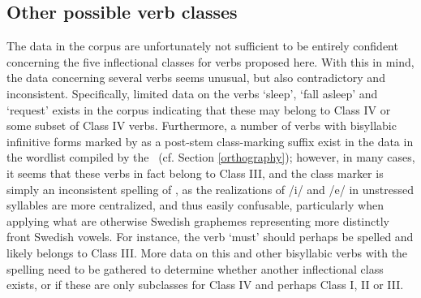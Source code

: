 \subsection{Other possible verb classes}\label{otherVerbClasses}
The data in the corpus are unfortunately not sufficient to be entirely confident concerning the five inflectional classes for verbs proposed here. With this in mind, the data concerning several verbs seems unusual, but also contradictory and inconsistent. Specifically, limited data on the verbs  ‘sleep’,  ‘fall asleep’  %
and  ‘request’ %
exists in the corpus indicating that these may belong to Class IV or some subset of Class IV verbs. Furthermore, a number of verbs with bisyllabic infinitive forms marked by  as a post-stem class-marking suffix exist in the data in the wordlist compiled by the \WLP\ (cf. Section \ref{orthography}); however, in many cases, it seems that these verbs in fact belong to Class III, and the  class marker is simply an inconsistent spelling of , as the realizations of /i/ and /e/ in unstressed syllables are more centralized, and thus easily confusable, particularly when applying what are otherwise Swedish graphemes representing more distinctly front Swedish vowels. For instance, the verb  ‘must’ should perhaps be spelled  and likely belongs to Class III. More data on this and other bisyllabic verbs with the  spelling need to be gathered to determine whether another inflectional class exists, or if these are only subclasses for Class IV and perhaps Class I, II or III. 




